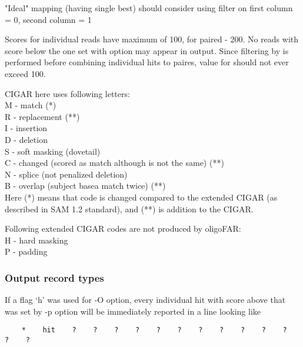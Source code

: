 \documentclass[english,letter]{article}
\begin{document}
    "Ideal" mapping (having single best) should consider using filter on first 
    column = 0, second column = 1

    Scores for individual reads have maximum of 100, for paired - 200. No
    reads with score below the one set with  option may appear in output.
    Since filtering by  is performed before combining individual hits to
    paires, value for  should not ever exceed 100. 

    CIGAR here uses following letters:\\
        M - match (*)\\
        R - replacement (**)\\
        I - insertion\\
        D - deletion\\
        S - soft masking (dovetail)\\
        C - changed (scored as match although is not the same) (**)\\
        N - splice (not penalized deletion)\\
        B - overlap (subject basea match twice) (**)\\
    Here (*) means that code is changed compared to the extended CIGAR
    (as described in SAM 1.2 standard), and (**) is addition to the CIGAR.

    Following extended CIGAR codes are not produced by oligoFAR:\\
        H - hard masking\\
        P - padding

%
%
%
%
%

\subsubsection{Output record types}
    If a flag `h' was used for -O option, every individual hit with score above
    that was set by -p option will be immediately reported in a line looking
    like
	\begin{verbatim}
    *    hit    ?    ?    ?    ?    ?    ?    ?    ?    ?    ?    ?    ?    ?
	\end{verbatim}
\end{document}
